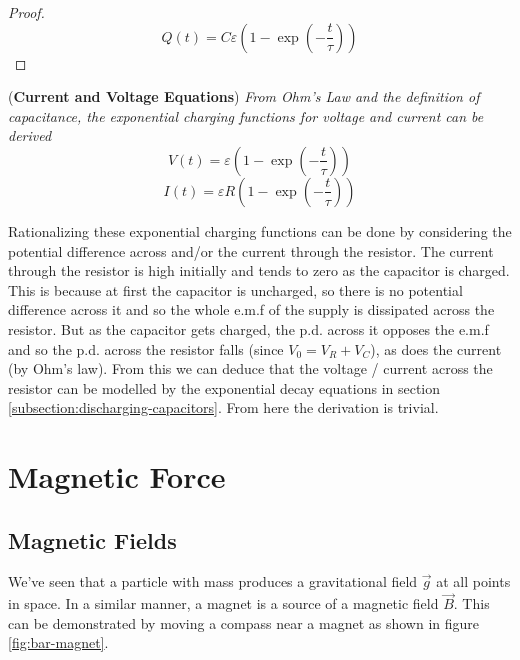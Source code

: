 \begin{theorem}
\begin{proof}
\begin{equation*}
    Q(t) = C \varepsilon \left( 1 - \exp \left( - \frac{t}{\tau} \right) \right)
\end{equation*}
\end{proof}
\begin{corollary}{(\textbf{Current and Voltage Equations})}
\textit{From Ohm's Law and the definition of capacitance, the exponential charging functions for voltage and current can be derived}
\begin{equation}
    V(t) = \varepsilon \left( 1 - \exp\left(-\frac{t}{\tau}\right)\right)
\end{equation}
\begin{equation}
    I(t) = \varepsilon R \left( 1 - \exp\left(-\frac{t}{\tau}\right)\right)
\end{equation}
\end{corollary}
\end{theorem}

Rationalizing these exponential charging functions can be done by considering the potential difference across and/or the current through the resistor. The current through the resistor is high initially and tends to zero as the capacitor is charged. This is because at first the capacitor is uncharged, so there is no potential difference across it and so the whole e.m.f of the supply is dissipated across the resistor. But as the capacitor gets charged, the p.d. across it opposes the e.m.f and so the p.d. across the resistor falls (since $V_0 = V_R + V_C$), as does the current (by Ohm's law). From this we can deduce that the voltage / current across the resistor can be modelled by the exponential decay equations in section \ref{subsection:discharging-capacitors}. From here the derivation is trivial. 

\section{Magnetic Force}

\subsection{Magnetic Fields}

We've seen that a particle with mass produces a gravitational field $\vec{g}$ at all points in space. In a similar manner,  a magnet is a source of a magnetic field $\vec{B}$. This can be demonstrated by moving a compass near a magnet as shown in figure \ref{fig:bar-magnet}.

